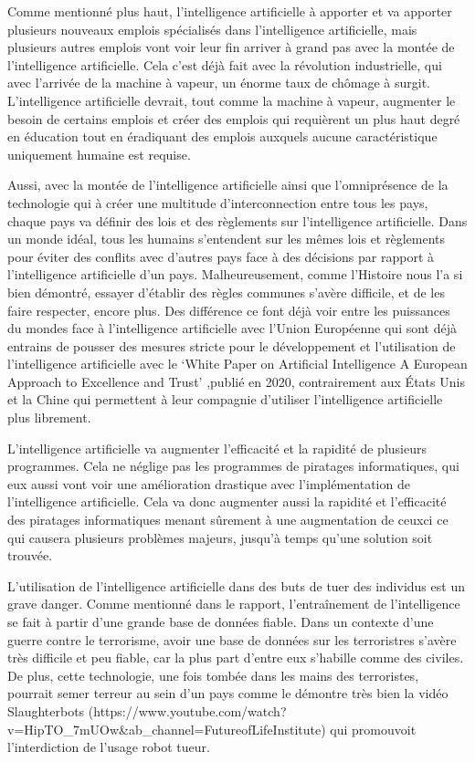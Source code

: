 \documentclass[letterpaper,10pt,french]{sphinxmanual}
\begin{document}
Comme mentionné plus haut, l’intelligence artificielle à apporter et va apporter plusieurs nouveaux emplois spécialisés dans l’intelligence artificielle, mais plusieurs autres emplois vont voir leur fin arriver à grand pas avec la montée de l’intelligence artificielle. Cela c’est déjà fait avec la révolution industrielle, qui avec l’arrivée de la machine à vapeur, un énorme taux de chômage à surgit. L’intelligence artificielle devrait, tout comme la machine à vapeur, augmenter le besoin de certains emplois et créer des emplois qui requièrent un plus haut degré en éducation tout en éradiquant des emplois auxquels aucune caractéristique uniquement humaine est requise.

Aussi, avec la montée de l’intelligence artificielle ainsi que l’omniprésence de la technologie qui à créer une multitude d’interconnection entre tous les pays, chaque pays va définir des lois et des règlements sur l’intelligence artificielle. Dans un monde idéal, tous les humains s’entendent sur les mêmes lois et règlements pour éviter des conflits avec d’autres pays face à des décisions par rapport à l’intelligence artificielle d’un pays. Malheureusement, comme l’Histoire nous l’a si bien démontré, essayer d’établir des règles communes s’avère difficile, et de les faire respecter, encore plus. Des différence ce font déjà voir entre les puissances du mondes face à l’intelligence artificielle avec l’Union Européenne qui sont déjà entrains de pousser des mesures stricte pour le développement et l’utilisation de l’intelligence artificielle avec le ‘White Paper on Artificial Intelligence \textendash{} A European Approach to Excellence and Trust’ ,publié en 2020, contrairement aux États \sphinxhyphen{} Unis et la Chine qui permettent à leur compagnie d’utiliser l’intelligence artificielle plus librement.

L’intelligence artificielle va augmenter l’efficacité et la rapidité de plusieurs programmes. Cela ne néglige pas les programmes de piratages informatiques, qui eux aussi vont voir une amélioration drastique avec l’implémentation de l’intelligence artificielle. Cela va donc augmenter aussi la rapidité et l’efficacité des piratages informatiques menant sûrement à une augmentation de ceux\sphinxhyphen{}ci ce qui causera plusieurs problèmes majeurs, jusqu’à temps qu’une solution soit trouvée.

L’utilisation de l’intelligence artificielle dans des buts de tuer des individus est un grave danger. Comme mentionné dans le rapport, l’entraînement de l’intelligence se fait à partir d’une grande base de données fiable. Dans un contexte d’une guerre contre le terrorisme, avoir une base de données sur les terroristres s’avère très difficile et peu fiable, car la plus part d’entre eux s’habille comme des civiles. De plus, cette technologie, une fois tombée dans les mains des terroristes, pourrait semer terreur au sein d’un pays comme le démontre très bien la vidéo Slaughterbots (https://www.youtube.com/watch?v=HipTO\_7mUOw\&ab\_channel=FutureofLifeInstitute) qui promouvoit l’interdiction de l’usage robot tueur.
\end{document}

